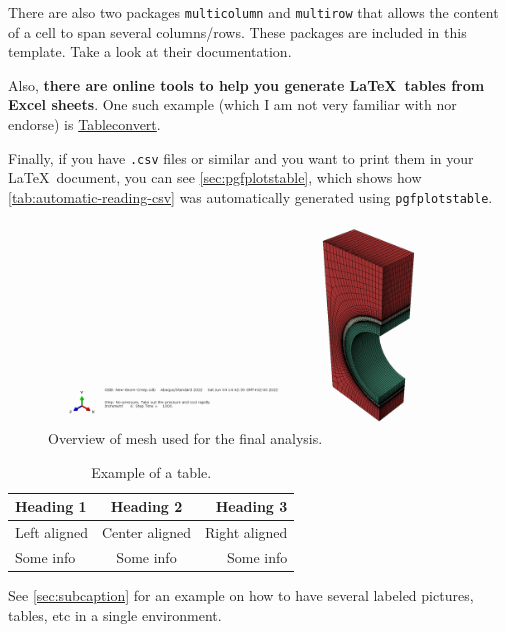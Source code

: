 \begin{description}
	There are also two packages \verb|multicolumn| and \verb|multirow| that allows the content of a cell to span several columns/rows. These packages are included in this template. Take a look at their documentation.

	Also, \textbf{there are online tools to help you generate \LaTeX\ tables from Excel sheets}. One such example (which I am not very familiar with nor endorse) is \href{https://tableconvert.com/excel-to-latex}{Tableconvert}.

	Finally, if you have \texttt{.csv} files or similar and you want to print them in your \LaTeX\ document, you can see \cref{sec:pgfplotstable}, which shows how \cref{tab:automatic-reading-csv} was automatically generated using \verb|pgfplotstable|.
\end{description}

\begin{figure}[h]
	\centering %
	\includegraphics[keepaspectratio, trim = 1050 12 150 30, clip, width=0.5\linewidth, height=0.3\textheight]{Images/monoblock-material-overview-mesh.png}
	\caption[Overview of  mesh used for the final analysis.]{Overview of  mesh used for the final analysis.}
	\label{fig:monoblock-overview-mesh}
\end{figure}

\begin{table}[h]
	\centering %
	\begin{tabular}{lcr}
	  \toprule
	  Heading 1 & Heading 2 & Heading 3 \\
	  \midrule
	  Left aligned & Center aligned & Right aligned \\
	  \cmidrule{2-3} %
	  Some info & Some info & Some info \\
	  \bottomrule
	\end{tabular}
	\caption{Example of a table.}
	\label{tab:example-table}
\end{table}

See \cref{sec:subcaption} for an example on how to have several labeled pictures, tables, etc in a single environment.

